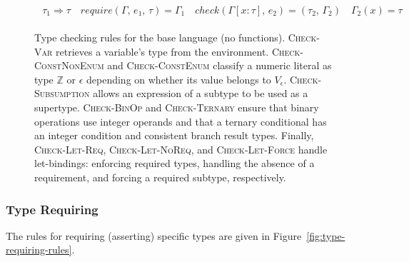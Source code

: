 \documentclass[peerreview, 10pt]{IEEEtran}
\newcommand{\Z}{\ensuremath{\mathbb{Z}}}
\newcommand{\checktype}[4]{\ensuremath{{check}(#1,\,#2)=(#3,\,#4)}}
\newcommand{\requiretype}[4]{\ensuremath{{require}(#1,\,#2,\,#3)=#4}}
\newcommand{\forcerequire}[2]{\ensuremath{#1\Rightarrow#2}}
\begin{document}
\begin{figure*}[ht]
\begin{framed}
\begin{align*}
{\begin{array}{c}
\forcerequire{\tau_1}{\tau} \quad \requiretype{\Gamma}{e_1}{\tau}{\Gamma_1} \quad
\checktype{\Gamma[x:\tau]}{e_2}{\tau_2}{\Gamma_2} \quad \Gamma_2(x) = \tau
\end{array}
}
\end{align*}
\end{framed}
\caption{Type checking rules for the base language (no functions). \textsc{Check-Var} retrieves a variable's type from the environment. \textsc{Check-ConstNonEnum} and \textsc{Check-ConstEnum} classify a numeric literal as type $\Z$ or $\epsilon$ depending on whether its value belongs to $V_\epsilon$. \textsc{Check-Subsumption} allows an expression of a subtype to be used as a supertype. \textsc{Check-BinOp} and \textsc{Check-Ternary} ensure that binary operations use integer operands and that a ternary conditional has an integer condition and consistent branch result types. Finally, \textsc{Check-Let-Req}, \textsc{Check-Let-NoReq}, and \textsc{Check-Let-Force} handle let-bindings: enforcing required types, handling the absence of a requirement, and forcing a required subtype, respectively.}
\label{fig:type-checking-rules}
\end{figure*}

\subsubsection{Type Requiring}
The rules for requiring (asserting) specific types are given in Figure~\ref{fig:type-requiring-rules}.
\end{document}
